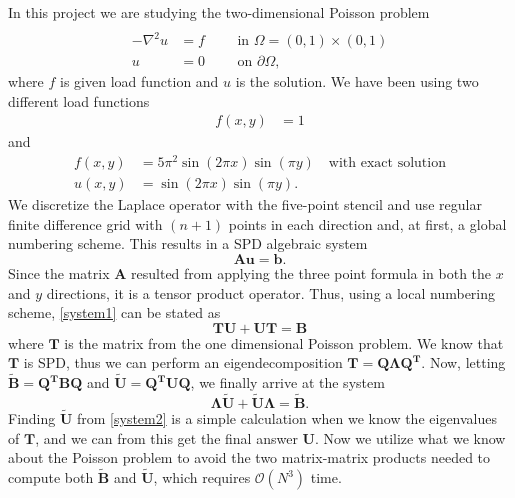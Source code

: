 In this project we are studying the two-dimensional Poisson problem
\begin{align}\\
\label{Poisson}
-\nabla^2u&=f \quad\quad\text{ in } \Omega=(0,1)\times(0,1)\\
u&=0 \quad\quad\text{ on } \partial \Omega, \nonumber
\end{align}
where $f$ is given load function and $u$ is the solution. We have been using two different load functions
\begin{align*}
f(x,y)&=1
\end{align*}
and
\begin{align}
\label{loadfunc2}
f(x,y)&=5\pi^2\sin(2\pi x)\sin(\pi y) \quad\text{with exact solution} \\
u(x,y)&=\sin(2\pi x)\sin(\pi y).\nonumber
\end{align}
We discretize the Laplace operator with the five-point stencil and use regular finite difference grid with $(n+1)$ points in each direction and, at first, a global numbering scheme. This results in a SPD algebraic system
\begin{equation}
	\mathbf{Au} = \mathbf{b}.
	\label{system1}
\end{equation}
Since the matrix $\mathbf{A}$ resulted from applying the three point formula in both the $x$ and $y$ directions, it is a tensor product operator. Thus, using a local numbering scheme, \eqref{system1} can be stated as 
\begin{equation}
	\mathbf{TU} + \mathbf{UT} = \mathbf{B}
\end{equation}
where $\mathbf{T}$ is the matrix from the one dimensional Poisson problem. We know that $\mathbf{T}$ is SPD, thus we can perform an eigendecomposition $\mathbf{T} = \mathbf{Q\Lambda Q^T}$. Now, letting $\mathbf{\widetilde{B}} = \mathbf{Q^TBQ}$ and $\mathbf{\widetilde{U}} = \mathbf{Q^TUQ}$, we finally arrive at the system 
\begin{equation}
	\mathbf{\Lambda\widetilde{U}} + \mathbf{\widetilde{U}\Lambda} = \mathbf{\widetilde{B}}.
	\label{system2}
\end{equation}
Finding $\mathbf{\widetilde{U}}$ from \eqref{system2} is a simple calculation when we know the eigenvalues of $\mathbf{T}$, and we can from this get the final answer $\mathbf{U}$. Now we utilize what we know about the Poisson problem to avoid the two matrix-matrix products needed to compute both $\mathbf{\widetilde{B}}$ and $\mathbf{\widetilde{U}}$, which requires $\mathcal{O}(N^3)$ time. \\
